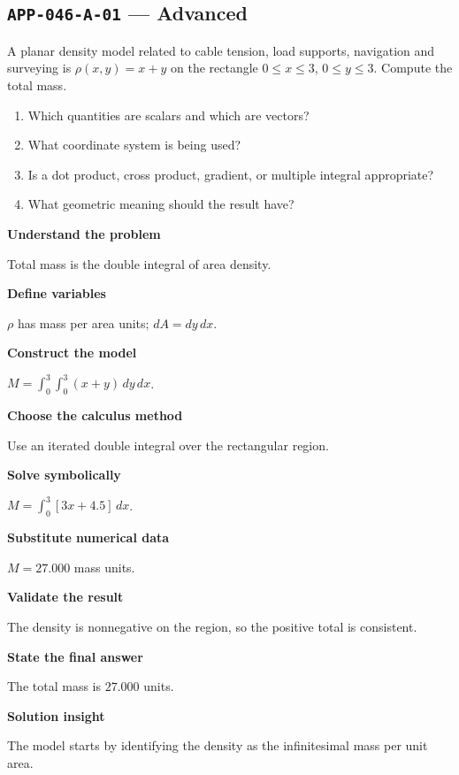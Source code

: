 \documentclass[11pt]{book}
\newcommand{\pid}[1]{\texttt{#1}}
\begin{document}
\subsection*{\pid{APP-046-A-01} — Advanced}
\begin{problembox}
A planar density model related to cable tension, load supports, navigation and surveying is $\rho(x,y)=x+y$ on the rectangle $0\le x\le 3$, $0\le y\le 3$. Compute the total mass.
\end{problembox}
\begin{promptbox}\begin{enumerate}
\item Which quantities are scalars and which are vectors?
\item What coordinate system is being used?
\item Is a dot product, cross product, gradient, or multiple integral appropriate?
\item What geometric meaning should the result have?
\end{enumerate}\end{promptbox}
\begin{solutionbox}
\textbf{Understand the problem}\par Total mass is the double integral of area density.\par\medskip
\textbf{Define variables}\par $\rho$ has mass per area units; $dA=dy\,dx$.\par\medskip
\textbf{Construct the model}\par $M=\int_0^{3}\int_0^{3}(x+y)\,dy\,dx$.\par\medskip
\textbf{Choose the calculus method}\par Use an iterated double integral over the rectangular region.\par\medskip
\textbf{Solve symbolically}\par $M=\int_0^{3}[3x+4.5]\,dx$.\par\medskip
\textbf{Substitute numerical data}\par $M=27.000$ mass units.\par\medskip
\textbf{Validate the result}\par The density is nonnegative on the region, so the positive total is consistent.\par\medskip
\textbf{State the final answer}\par The total mass is $27.000$ units.\par\medskip
\textbf{Solution insight}\par The model starts by identifying the density as the infinitesimal mass per unit area.\par\medskip
\end{solutionbox}
\end{document}

